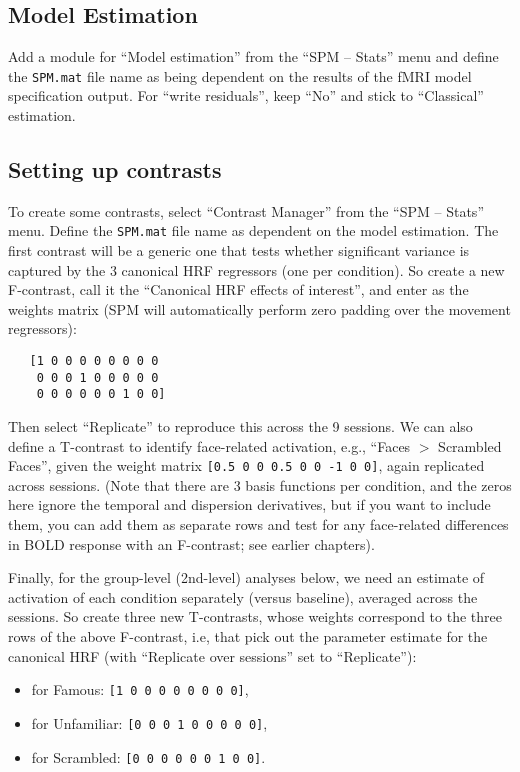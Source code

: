 \subsection{Model Estimation}

Add a module for ``Model estimation'' from the ``SPM -- Stats'' menu and define the \texttt{SPM.mat} file name as being dependent on the results of the fMRI model specification output. For ``write residuals'', keep ``No'' and stick to ``Classical'' estimation.

\subsection{Setting up contrasts}

To create some contrasts, select ``Contrast Manager'' from the ``SPM -- Stats'' menu. Define the \texttt{SPM.mat} file name as dependent on the model estimation. The first contrast will be a generic one that tests whether significant variance is captured by the 3 canonical HRF regressors (one per condition). So create a new F-contrast, call it the ``Canonical HRF effects of interest'', and enter as the weights matrix (SPM will automatically perform zero padding over the movement regressors):
\begin{verbatim}
   [1 0 0 0 0 0 0 0 0
    0 0 0 1 0 0 0 0 0
    0 0 0 0 0 0 1 0 0]
\end{verbatim}
Then select ``Replicate'' to reproduce this across the 9 sessions. We can also define a T-contrast to identify face-related activation, e.g., ``Faces \(>\) Scrambled Faces'', given the weight matrix \texttt{[0.5 0 0  0.5 0 0  -1 0 0]}, again replicated across sessions. (Note that there are 3 basis functions per condition, and the zeros here ignore the temporal and dispersion derivatives, but if you want to include them, you can add them as separate rows and test for any face-related differences in BOLD response with an F-contrast; see earlier chapters).

Finally, for the group-level (2nd-level) analyses below, we need an estimate of activation of each condition separately (versus baseline), averaged across the sessions. So create three new T-contrasts, whose weights correspond to the three rows of the above F-contrast, i.e, that pick out the parameter estimate for the canonical HRF (with ``Replicate over sessions'' set to ``Replicate''):

\begin{itemize}
    \setlength\itemsep{0em}
	\item[] for Famous: \texttt{[1 0 0 0 0 0 0 0 0]},
	\item[] for Unfamiliar: \texttt{[0 0 0 1 0 0 0 0 0]},
	\item[] for Scrambled: \texttt{[0 0 0 0 0 0 1 0 0]}.
\end{itemize}

